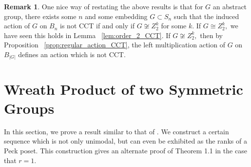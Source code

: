 \documentclass[10 pt]{amsart}
\theoremstyle{plain}
\newtheorem{prop}[thm]{Proposition}
\theoremstyle{definition}
\newtheorem{rem}[thm]{Remark}
\theoremstyle{remark}
\numberwithin{equation}{section}
\newcommand\BR{{\mathbb R}}
\newcommand\BZ{{\mathbb Z}}
\begin{document}
\begin{rem}
One nice way of restating the above results is that for $G$ an abstract group, there exists some $n$ and some embedding $G \subset S_n$ such that the induced action of $G$ on $B_n$ is not CCT if and only if $G \not \cong Z_2^k$ for some $k.$ If $G\cong Z_2^k,$ we have seen this holds in Lemma ~\ref{lem:order_2_CCT}. If $G \not \cong Z_2^k,$ then by Proposition ~\ref{prop:regular_action_CCT}, the left multiplication action of $G$ on $B_{|G|}$ defines an action which is not CCT.
\end{rem}
\iffalse
\begin{prop}
Let $G$ be the group of linear automorphisms of the cube, embedded in $\BR^n,$ whose vertices are located at the points $(\pm 1, \ldots, \pm 1).$ Then, the action of $G$ on the cube induces an action of $G$ on the $2^n$ vertices of the octahedron, and hence on $B_{2^n}.$ This induced action on $B_{2^n}$ is CCT. 
\end{prop}
\begin{proof}
It is easy to see that the group of linear automorphisms of the cube can be written as the semidirect product $\BZ^n_2 \rtimes S_n.$ The generator of the $i^{th}$ copy of $\BZ_2$ in $\BZ^n_2,$ acts by changing the sign of the $i^{th}$ coordinate, while $S_n$ acts by permuting the coordinates. Using Proposition ~\ref{prop:semidirect_product_preservation}, it suffices to show that the action of $\BZ_2^n$ on $B_{2^n}$ is CCT and the action of $S_n$ on $B_{2^n}/(\BZ_2^n)$ is CCT.

First, by Lemma ~\ref{lem:order_2_CCT}, we know the action of $\BZ_2^n$ on $B_{2^n}$ is CCT. Second, we wish to examine the action of $S_n$ on the quotient poset $B_{2^n}/(\BZ_2^n).$ 
\end{proof}
\fi






\section{Wreath Product of two Symmetric Groups}\label{sec:wreath_product}

In this section, we prove a result similar to that of \cite[Theorem 1.1]{pak}. We construct a certain sequence which is not only unimodal, but can even be exhibited as the ranks of a Peck poset. This construction gives an alternate proof of Theorem 1.1 in the case that $r = 1.$
\end{document}
